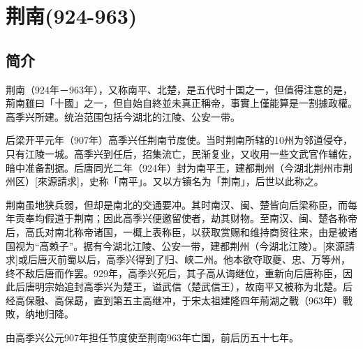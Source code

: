 

\section{荆南\tiny(924-963)}

\subsection{简介}

荆南（924年－963年），又称南平、北楚，是五代时十国之一，但值得注意的是，荊南雖曰「十國」之一，但自始自終並未真正稱帝，事實上僅能算是一割據政權。高季兴所建。统治范围包括今湖北的江陵、公安一带。

后梁开平元年（907年）高季兴任荆南节度使。当时荆南所辖的10州为邻道侵夺，只有江陵一城。高季兴到任后，招集流亡，民渐复业，又收用一些文武官作辅佐，暗中准备割据。后唐同光二年（924年）封为南平王，建都荆州（今湖北荆州市荆州区）[來源請求]，史称「南平」。又以方镇名为「荆南」，后世以此称之。

荆南虽地狭兵弱，但却是南北的交通要冲。其时南汉、闽、楚皆向后梁称臣，而每年贡奉均假道于荆南；因此高季兴便邀留使者，劫其财物。至南汉、闽、楚各称帝后，高氏对南北称帝诸国，一概上表称臣，以获取赏赐和维持商贸往来，由是被诸国视为“高赖子”。据有今湖北江陵、公安一带，建都荆州（今湖北江陵）。[來源請求]或后唐灭前蜀以后，高季兴得到了归、峡二州。他本欲夺取夔、忠、万等州，终不敌后唐而作罢。929年，高季兴死后，其子高从诲继位，重新向后唐称臣，因此后唐明宗始追封高季兴为楚王，谥武信（楚武信王），故南平又被称为北楚。后经高保融、高保勗，直到第五主高继冲，于宋太祖建隆四年荊湖之戰（963年）戰敗，纳地归降。

由高季兴公元907年担任节度使至荆南963年亡国，前后历五十七年。








